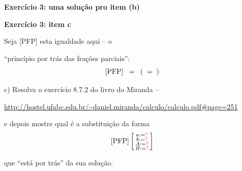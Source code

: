 \documentclass[oneside,12pt]{article}
\begin{document}
\newpage

{\bf Exercício 3: uma solução pro item (b)}







\newpage


{\bf Exercício 3: item c}

Seja [PFP] esta igualdade aqui -- o

``princípio por trás das frações parciais'':
%
$$\text{[PFP]} \;\;=\;\;
  \left(\ga{f1} \;\;=\;\; \ga{f1.6}
  \right)
$$

\msk

c) Resolva o exercício 8.7.2 do livro do Miranda --

\ssk

{\scriptsize

\url{http://hostel.ufabc.edu.br/~daniel.miranda/calculo/calculo.pdf#page=251}

}

\ssk

\def\rq{\ColorRed{?}}

e depois mostre qual é a substituição da forma
%
$$\text{[PFP]} \bsm{a:=\rq \\ b:=\rq \\ A:=\rq \\ B:=\rq}
$$

que ``está por trás'' da sua solução.


\newpage
\end{document}
